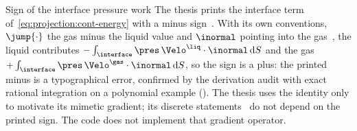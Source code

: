 \begin{deviation}{Sign of the interface pressure work}\label{dev:projection:interface-work}
The thesis prints the interface term of~\cref{eq:projection:cont-energy}
with a minus sign~. With its own conventions, $\jump{\cdot}$
the gas minus the liquid value and $\inormal$ pointing into the
gas~, the liquid contributes
$-\integral{\interface}{\pres\,\Velo^{\liq}\cdot\inormal}{S}$ and the gas
$+\integral{\interface}{\pres\,\Velo^{\gas}\cdot\inormal}{S}$, so the sign is a
plus: the printed minus is a typographical error, confirmed by the derivation
audit with exact rational integration on a polynomial example
(). The thesis uses the identity
only to motivate its mimetic gradient; its discrete
statements~ do not depend on the printed sign.
The code does not implement that gradient operator.
\end{deviation}

